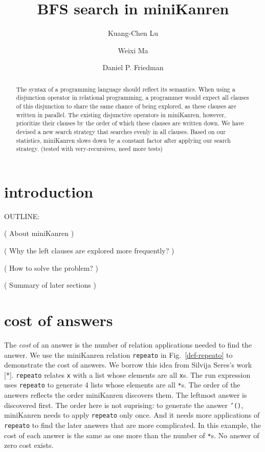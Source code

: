 \documentclass[format=acmlarge, review=true, authordraft=true]{acmart}
\title{BFS search in miniKanren}
\author{Kuang-Chen Lu}
\affiliation{Indiana University}
\author{Weixi Ma}
\affiliation{Indiana University}
\author{Daniel P. Friedman}
\affiliation{Indiana University}
\begin{document}
\begin{abstract}

The syntax of a programming language should reflect its semantics.
When using a disjunction operator in relational programming, a programmer would
expect all clauses of this disjunction to share the same chance of being explored,
as these clauses are written in parallel. The existing disjunctive operators in miniKanren,
however, prioritize their clauses by the order of which these clauses are written down.
We have devised a new search strategy that searches evenly in all clauses.
Based on our statistics, miniKanren slows down by a constant factor after applying our search strategy.
(tested with very-recursiveo, need more tests)


\end{abstract}

\maketitle

\section{introduction}

OUTLINE:

( About miniKanren )

( Why the left clauses are explored more frequently? )


( How to solve the problem? )

( Summary of later sections )

\section{cost of answers}


The \emph{cost} of an answer is the number of relation applications needed to find the answer. We use the miniKanren relation \texttt{repeato} in Fig.~\ref{def-repeato} to demonstrate the cost of answers. We borrow this idea from Silvija Seres's work [*]. \texttt{repeato} relates \texttt{x} with a list whose elements are all \texttt{x}s. The run expression uses \texttt{repeato} to generate 4 lists whose elements are all \texttt{*}s. The order of the answers reflects the order miniKanren discovers them. The leftmost answer is discovered first. The order here is not suprising: to generate the answer \texttt{'()}, miniKanren needs to apply \texttt{repeato} only once. And it needs more applications of \texttt{repeato} to find the later answers that are more complicated. In this example, the cost of each answer is the same as one more than the number of \texttt{*}s. No answer of zero cost exists.
\end{document}
